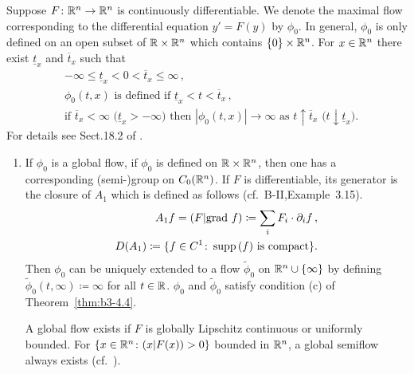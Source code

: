 \begin{example}\label{ex:b3-4.6}
	Suppose $F \colon \mathbb{R}^n \to \mathbb{R}^n$ is continuously differentiable.
	We denote the maximal flow corresponding to the differential equation $y' = F(y)$ by $\phi_{0}$.
	In general, $\phi_{0}$ is only defined on an open subset of $\mathbb{R} \times \mathbb{R}^n$ which contains $\{0\} \times \mathbb{R}^n$.
	For $x \in \mathbb{R}^n$ there exist $\underline{t}_{x}$ and $\overline{t}_{x}$ such that
	\begin{equation}\label{eq:b3-4.11}
		\begin{aligned}
			&-\infty \leq \underline{t}_{x} < 0 < \overline{t}_{x} \leq \infty\,, \\
			&\phi_{0}(t,x) \text{ is defined if } \underline{t}_{x} < t < \overline{t}_{x}\,, \\
			&\text{if } \overline{t}_{x} < \infty \text{ (}\underline{t}_{x} > -\infty\text{)} \text{ then } |\phi_{0}(t,x)| \to \infty \text{ as } t\uparrow\overline{t}_{x} \text{ (}t\downarrow\underline{t}_{x}\text{)}.
		\end{aligned}
	\end{equation}
	For details see Sect.18.2 of \citet{dieudonne:1971}.
	\begin{enumerate}[\upshape (a), wide, labelindent=.5em]
	\item
	If $\phi_{0}$ is a global flow, \ie if $\phi_{0}$ is defined on $\mathbb{R} \times \mathbb{R}^n$, then one has a corresponding (semi-)group on $C_{0}(\mathbb{R}^n)$.
	If $F$ is differentiable, its generator is the closure of $A_{1}$ which is defined as follows (cf.\ B-II,Example~3.15).
	\begin{equation}\label{eq:b3-4.12}
		\begin{aligned}
			A_{1}f = (F|\text{grad }f) \coloneq 
            {  \sum_i F_{i} \cdot \partial_{i}f} \,, \\
			D(A_{1}) \coloneq \{f \in C^1 \colon \mathop{}\!\mathrm{supp}\,(f)  \text{ is compact}\}.
		\end{aligned}
	\end{equation}
	Then $\phi_{0}$ can be uniquely extended to a flow $\tilde{\phi}_{0}$ on $\mathbb{R}^n\cup\{\infty\}$ by defining $\tilde{\phi}_{0}(t,\infty) \coloneq \infty$ for all $t \in \mathbb{R}$.
	$\phi_{0}$ and $\tilde{\phi}_{0}$ satisfy condition (c) of Theorem~\ref{thm:b3-4.4}.

    A global flow exists if $F$ is globally Lipschitz continuous or uniformly bounded. 
    For $\{x \in \mathbb{R}^n \colon (x|F(x)) > 0\}$ bounded in $\mathbb{R}^n$, a global semiflow always exists (cf.\ \citet[Section~5.2]{deimling:1977}).
    

\end{enumerate}
\end{example}
